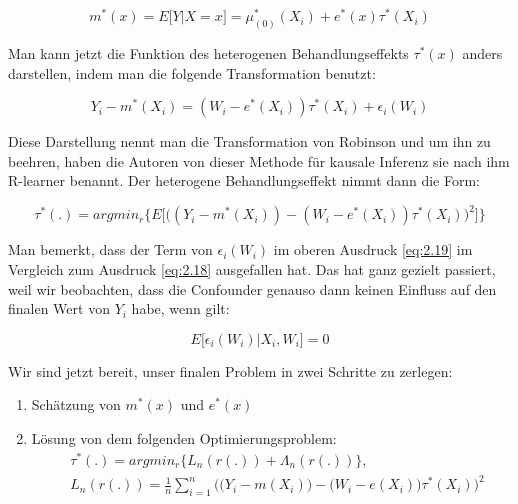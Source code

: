 \documentclass[12pt,a4paper,twoside]{scrartcl}
\numberwithin{equation}{section}
\begin{document}
\begin{equation}\label{eq:2.17}
  m^*(x) = E \big [Y |X=x \big ] =  \mu^*_{(0)}(X_i) + e^*(x)\tau^*(X_i) 
\end{equation}

\noindent
Man kann jetzt die Funktion des heterogenen Behandlungseffekts $\tau^*(x)$ anders darstellen, indem man die folgende Transformation benutzt:\par

\begin{equation}\label{eq:2.18}
 Y_i - m^*(X_i) = (W_i - e^*(X_i))\tau^*(X_i) + \epsilon_i(W_i) 
\end{equation}

\noindent
Diese Darstellung nennt man die Transformation von Robinson\cite{robinson1988root} und um ihn zu beehren, haben die Autoren von dieser Methode für kausale Inferenz sie nach ihm R-learner benannt. Der heterogene Behandlungseffekt nimmt dann die Form:\par 

\begin{equation}\label{eq:2.19}
 \tau^*(.) = argmin_r \bigg\{ E \bigg[ \bigg( ( Y_i - m^*(X_i)) - (W_i - e^*(X_i)) \tau^*(X_i)  \bigg)^2 \bigg] \bigg\}
\end{equation}

\noindent
Man bemerkt, dass der Term von $\epsilon_i(W_i)$ im oberen Ausdruck \ref{eq:2.19} im Vergleich zum Ausdruck \ref{eq:2.18} ausgefallen hat. Das hat ganz gezielt passiert, weil wir beobachten, dass die Confounder genauso dann keinen Einfluss auf den finalen Wert von $Y_i$ habe, wenn gilt:\par

\begin{equation}\label{eq:2.20}
	 E\big[\epsilon_i(W_i)|X_i,W_i\big] = 0
\end{equation}

\noindent
Wir sind jetzt bereit, unser finalen Problem in zwei Schritte zu zerlegen:\par

\begin{enumerate}
  \item Schätzung von $m^*(x)$ und $e^*(x)$ 
  \item Lösung von dem folgenden Optimierungsproblem: 
  \begin{equation}\label{eq:2.21}
  \begin{split}
  	& \tau^*(.) = argmin_r \big\{ L_n(r(.))+ \Lambda_n(r(.)) \big\},\\
    &  L_n(r(.)) = \frac{1}{n}\sum_{i=1}^{n} \big( \big( Y_i - m(X_i)\big) - \big(W_i - e(X_i)\big) \tau^*(X_i)  \big)^2	
  \end{split}
  	\end{equation}
\end{enumerate}
\end{document}

